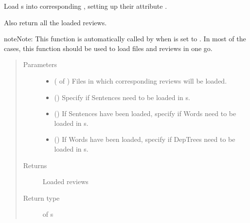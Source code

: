 \documentclass[letterpaper,10pt,english]{sphinxmanual}
\begin{document}
\begin{fulllineitems}
\label{\detokenize{load:loacore.load.review_load.load_reviews_in_files}}
Load  s into corresponding , setting up their attribute .

Also return all the loaded reviews.

\begin{sphinxadmonition}{note}{Note:}
This function is automatically called by  when  is set to
. In most of the cases, this function should be used to load files and reviews in one go.
\end{sphinxadmonition}
\begin{quote}\begin{description}
\item[{Parameters}] \leavevmode\begin{itemize}
\item {} 
 ( of ) \textendash{} Files in which corresponding reviews will be loaded.

\item {} 
 () \textendash{} Specify if Sentences need to be loaded in  s.

\item {} 
 () \textendash{} If Sentences have been loaded, specify if Words need to be loaded in  s.

\item {} 
 () \textendash{} If Words have been loaded, specify if DepTrees need to be loaded in  s.

\end{itemize}

\item[{Returns}] \leavevmode
Loaded reviews

\item[{Return type}] \leavevmode
{} of  s

\end{description}\end{quote}

\end{fulllineitems}
\end{document}
